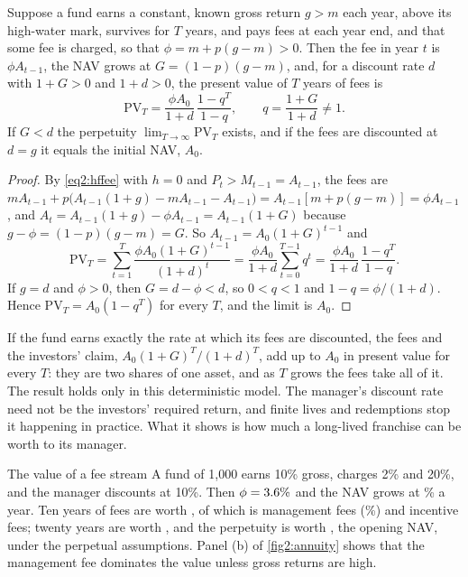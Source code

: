 \begin{chapterrefs}
\begin{proposition}\label{prop2:annuity}
Suppose a fund earns a constant, known gross return $g > m$ each year, above its high-water mark,
survives for $T$ years, and pays fees at each year end, and that some fee is charged, so that
$\phi = m + p(g-m) > 0$. Then the fee in year $t$ is $\phi A_{t-1}$, the NAV grows at $G = (1-p)(g-m)$, and, for a discount rate $d$ with $1+G>0$ and
$1+d>0$, the present value of $T$ years of fees is
\begin{equation}\label{eq2:annuity}
  \mathrm{PV}_T = \frac{\phi A_0}{1+d}\,\frac{1-q^{T}}{1-q}, \qquad q = \frac{1+G}{1+d}\ne 1 .
\end{equation}
If $G<d$ the perpetuity $\lim_{T\to\infty}\mathrm{PV}_T$ exists, and if the fees are discounted at $d = g$
it equals the initial NAV, $A_0$.
\end{proposition}
\begin{proof}
By \cref{eq2:hffee} with $h=0$ and $P_t > M_{t-1} = A_{t-1}$, the fees are
$mA_{t-1} + p\bigl(A_{t-1}(1+g) - mA_{t-1} - A_{t-1}\bigr) = A_{t-1}[m + p(g-m)] = \phi A_{t-1}$, and
$A_t = A_{t-1}(1+g) - \phi A_{t-1} = A_{t-1}(1+G)$ because $g - \phi = (1-p)(g-m) = G$. So
$A_{t-1} = A_0(1+G)^{t-1}$ and
\begin{equation*}
  \mathrm{PV}_T = \sum_{t=1}^{T} \frac{\phi A_0 (1+G)^{t-1}}{(1+d)^{t}}
           = \frac{\phi A_0}{1+d} \sum_{t=0}^{T-1} q^{t}
           = \frac{\phi A_0}{1+d}\,\frac{1-q^T}{1-q}.
\end{equation*}
If $g = d$ and $\phi > 0$, then $G = d - \phi < d$, so $0 < q < 1$ and $1 - q = \phi/(1+d)$. Hence
$\mathrm{PV}_T = A_0(1-q^T)$ for every $T$, and the limit is $A_0$.
\end{proof}

If the fund earns exactly the rate at which its fees are discounted, the fees and the investors'
claim, $A_0(1+G)^T/(1+d)^T$, add up to $A_0$ in present value for every $T$: they are two shares of
one asset, and as $T$ grows the fees take all of it. The result holds only in this deterministic model. The manager's
discount rate need not be the investors' required return, and finite lives and redemptions stop it
happening in practice. What it shows is how much a long-lived franchise can be worth to its manager.

\begin{example}{The value of a fee stream}\label{ex2:annuity}
A fund of 1,000 earns 10\% gross, charges 2\% and 20\%, and the manager discounts at 10\%. Then
$\phi = 3.6\%$ and the NAV grows at \annNetGrowth\% a year. Ten years of fees are worth \annPV, of which
\annPVm{} is management fees (\annMgmtShare\%) and \annPVi{} incentive fees; twenty years are worth
\annPVtwenty, and the perpetuity is worth \annPVperp, the opening NAV, under the perpetual assumptions. Panel (b) of \cref{fig2:annuity}
shows that the management fee dominates the value unless gross returns are high.
\end{example}


\end{chapterrefs}
